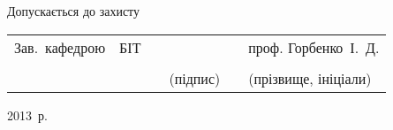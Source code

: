 \begin{center}
        \vfill
        \begin{flushleft}
            \hspace{4ex}Допускається до захисту \\[1ex]
        \end{flushleft}
        \begin{tabular}{
            p{}
            >{\centering\arraybackslash}p{}
            >{\centering\arraybackslash}p{}
            >{\centering\arraybackslash}p{}
            >{\centering\arraybackslash}p{}
            >{\centering\arraybackslash}p{}}
            \mbox{Зав. кафедрою} & БІТ & & & & проф. Горбенко~І.~Д. \\ \cline{2-2}\cline{4-4}\cline{6-6} \\[-4ex]
                                       & & & {\scriptsize (підпис)} & & {\scriptsize (прізвище, ініціали)} \\[1ex]
        \end{tabular}
        \vfill
        2013~р.
    \end{center}
    \clearpage
